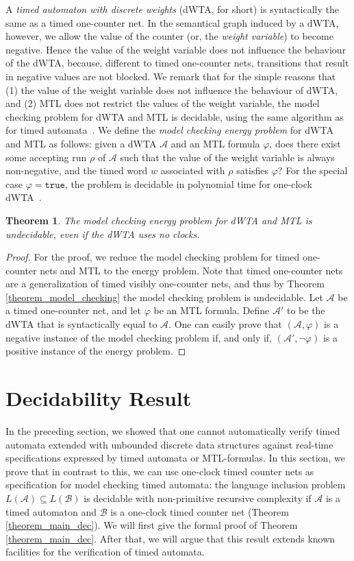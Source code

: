 \documentclass{CSML}
\theoremstyle{plain}\newtheorem{theorem}[thm]{Theorem}
\theoremstyle{plain}\newtheorem{corollary}[thm]{Corollary}
\theoremstyle{plain}\newtheorem{example}[thm]{Example}
\theoremstyle{plain}\newtheorem{lemma}[thm]{Lemma}
\theoremstyle{plain}\newtheorem{remark}[thm]{Remark}
\newcommand{\B}{\mathcal{B}}
\newcommand{\mtl}{MTL }
\newcommand{\true}{\mathtt{true}}
\newcommand{\A}{\mathcal{A}}
\begin{document}
A \emph{timed automaton with discrete weights} (dWTA, for short)
is syntactically the same as a timed one-counter net.
	In the semantical graph induced by a dWTA, however, we allow the value of the counter (or, the \emph{weight variable}) to become negative.
	Hence the value of the weight variable does not influence the behaviour of the dWTA, 
	because, different to timed one-counter nets, transitions that result in negative values are not blocked. 
	We remark that for the  simple reasons that (1) the value of the weight variable does not influence the behaviour of dWTA, and (2) MTL does not restrict the values of the weight variable, the model checking problem for dWTA and MTL is decidable, using the same algorithm as for timed automata~\cite{DBLP:conf/lics/OuaknineW05}. 
	We define the \emph{model checking energy problem} for dWTA and \mtl as follows: given a dWTA $\A$ and an \mtl formula $\varphi$, does there exist some accepting run $\rho$ of $\A$ such that the value of the weight variable is always non-negative, and the timed word $w$ associated with $\rho$ satisfies $\varphi$?	
	For the special case $\varphi=\true$, 
	the problem is decidable in polynomial time for one-clock dWTA~\cite{DBLP:conf/formats/BouyerFLMS08}.
	\begin{theorem}
		\label{theorem_energy}
		The model checking energy problem for dWTA and \mtl is undecidable, even if the dWTA uses no clocks. 
	\end{theorem}
	\begin{proof}		
		For the proof, we reduce the  model checking problem for timed one-counter nets and \mtl to the energy problem. 
		Note that timed one-counter nets are a generalization of timed visibly one-counter nets, and thus by Theorem \ref{theorem_model_checking} the model checking problem is undecidable. 
		Let $\A$ be a timed one-counter net, and let $\varphi$ be an \mtl formula. 
		Define $\A'$ to be the dWTA that is syntactically equal to $\A$.
		One can easily prove that $(\A,\varphi)$ is a negative instance of the model checking problem if, and only if, $(\A',\neg\varphi)$ is a positive instance of the energy problem. 
	\end{proof}
	


	\section{Decidability Result}
	In the preceding section, we showed that one cannot automatically verify  timed automata extended with unbounded discrete data structures against real-time specifications expressed by timed automata or MTL-formulas. 
	In this section, 
	we prove that in contrast to this, we can use one-clock timed counter nets as specification for model checking timed automata: the language inclusion problem $L(\A)\subseteq L(\B)$ is decidable with non-primitive recursive complexity if $\A$ is a timed automaton and $\B$ is a one-clock timed counter net (Theorem \ref{theorem_main_dec}).
	We will first give the formal proof of Theorem \ref{theorem_main_dec}. 
	After that, we will argue that this result extends known facilities for the verification of timed automata. 
	
\end{document}
